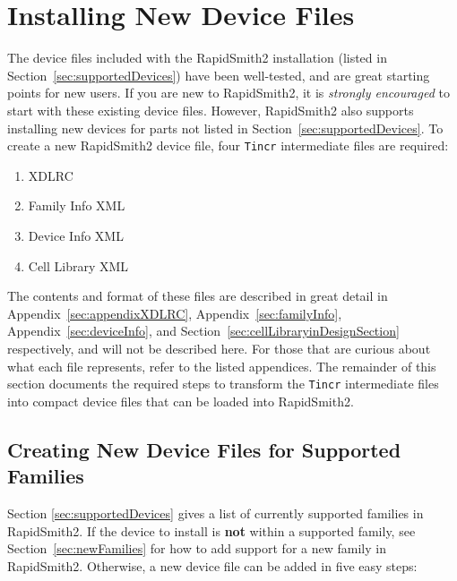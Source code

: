 \newpage
\section{Installing New Device Files} \label{sec:installingNewDevices}
\graphicspath{{./techReportFigures/sec10_deviceInstallation/}}

The device files included with the RapidSmith2 installation (listed in
Section~\ref{sec:supportedDevices}) have been well-tested, and are great starting
points for new users. If you are new to RapidSmith2, it is \textit{strongly
encouraged} to start with these existing device files. However, RapidSmith2
also supports installing new devices for parts not listed in
Section~\ref{sec:supportedDevices}. To create a new RapidSmith2 device
file, four \texttt{Tincr} intermediate files are required:

\begin{enumerate}
  \item XDLRC
  \item Family Info XML
  \item Device Info XML
  \item Cell Library XML
\end{enumerate}

\noindent The contents and format of these files are described in
great detail in Appendix~\ref{sec:appendixXDLRC}, Appendix~\ref{sec:familyInfo},
Appendix~\ref{sec:deviceInfo}, and Section~\ref{sec:cellLibraryinDesignSection}
respectively, and will not be described here. For those that are curious about
what each file represents, refer to the listed appendices. The remainder of this
section documents the required steps to transform the \texttt{Tincr}
intermediate files into compact device files that can be loaded into
RapidSmith2.

\subsection{Creating New Device Files for Supported Families}
\label{sec:creatingNewSupportedDevices} 
Section \ref{sec:supportedDevices} gives a list of currently supported
families in RapidSmith2. If the device to install is \textbf{not} within a
supported family, see Section~\ref{sec:newFamilies} for how to add support for a
new family in RapidSmith2. Otherwise, a new device file can be added in five
easy steps:

